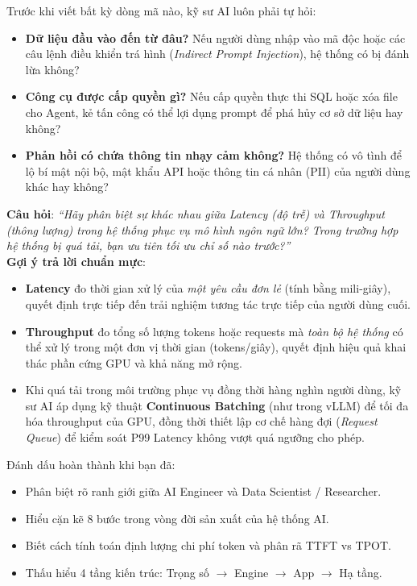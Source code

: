 \begin{securitybox}
Trước khi viết bất kỳ dòng mã nào, kỹ sư AI luôn phải tự hỏi:
\begin{itemize}
  \item \textbf{Dữ liệu đầu vào đến từ đâu?} Nếu người dùng nhập vào mã độc hoặc các câu lệnh điều khiển trá hình (\textit{Indirect Prompt Injection}), hệ thống có bị đánh lừa không?
  \item \textbf{Công cụ được cấp quyền gì?} Nếu cấp quyền thực thi SQL hoặc xóa file cho Agent, kẻ tấn công có thể lợi dụng prompt để phá hủy cơ sở dữ liệu hay không?
  \item \textbf{Phản hồi có chứa thông tin nhạy cảm không?} Hệ thống có vô tình để lộ bí mật nội bộ, mật khẩu API hoặc thông tin cá nhân (PII) của người dùng khác hay không?
\end{itemize}
\end{securitybox}

\begin{interviewbox}
\textbf{Câu hỏi}: \textit{``Hãy phân biệt sự khác nhau giữa Latency (độ trễ) và Throughput (thông lượng) trong hệ thống phục vụ mô hình ngôn ngữ lớn? Trong trường hợp hệ thống bị quá tải, bạn ưu tiên tối ưu chỉ số nào trước?''}\\
\textbf{Gợi ý trả lời chuẩn mực}:
\begin{itemize}
  \item \textbf{Latency} đo thời gian xử lý của \textit{một yêu cầu đơn lẻ} (tính bằng mili-giây), quyết định trực tiếp đến trải nghiệm tương tác trực tiếp của người dùng cuối.
  \item \textbf{Throughput} đo tổng số lượng tokens hoặc requests mà \textit{toàn bộ hệ thống} có thể xử lý trong một đơn vị thời gian (tokens/giây), quyết định hiệu quả khai thác phần cứng GPU và khả năng mở rộng.
  \item Khi quá tải trong môi trường phục vụ đồng thời hàng nghìn người dùng, kỹ sư AI áp dụng kỹ thuật \textbf{Continuous Batching} (như trong vLLM) để tối đa hóa throughput của GPU, đồng thời thiết lập cơ chế hàng đợi (\textit{Request Queue}) để kiểm soát P99 Latency không vượt quá ngưỡng cho phép.
\end{itemize}
\end{interviewbox}

\begin{checkpointbox}
Đánh dấu hoàn thành khi bạn đã:
\begin{itemize}
  \item[$\square$] Phân biệt rõ ranh giới giữa AI Engineer và Data Scientist / Researcher.
  \item[$\square$] Hiểu cặn kẽ 8 bước trong vòng đời sản xuất của hệ thống AI.
  \item[$\square$] Biết cách tính toán định lượng chi phí token và phân rã TTFT vs TPOT.
  \item[$\square$] Thấu hiểu 4 tầng kiến trúc: Trọng số $\rightarrow$ Engine $\rightarrow$ App $\rightarrow$ Hạ tầng.
\end{itemize}
\end{checkpointbox}

